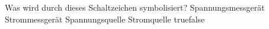     {Was wird durch dieses Schaltzeichen symbolisiert?}
    {Spannungsmessgerät}
    {Strommessgerät}
    {Spannungsquelle}
    {Stromquelle}
    {true}{false}